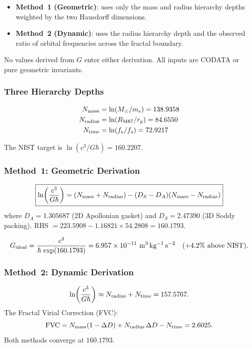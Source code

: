 \documentclass[11pt,a4paper]{article}
\begin{document}
\begin{itemize}
  \item \textbf{Method~1 (Geometric)}: uses only the mass and radius hierarchy depths weighted by the two Hausdorff dimensions.
  \item \textbf{Method~2 (Dynamic)}: uses the radius hierarchy depth and the observed ratio of orbital frequencies across the fractal boundary.
\end{itemize}

No values derived from $G$ enter either derivation. All inputs are CODATA or pure geometric invariants.

\subsubsection{Three Hierarchy Depths}

\begin{align}
  N_{\rm mass}   &= \ln(M_\odot/m_e) = 138.9358 \\
  N_{\rm radius} &= \ln(R_{\rm M87}/r_p) = 84.6550 \\
  N_{\rm time}   &= \ln(f_e/f_s) = 72.9217
\end{align}

The NIST target is $\ln(c^3/G\hbar) = 160.2207$.

\subsubsection{Method~1: Geometric Derivation}

\[
\boxed{
  \ln\!\left(\frac{c^3}{G\hbar}\right)
  = (N_{\rm mass} + N_{\rm radius})
    - (D_S - D_A)(N_{\rm mass} - N_{\rm radius})
}
\]
where $D_A = 1.305687$ (2D Apollonian gasket) and $D_S = 2.47390$ (3D Soddy packing). RHS $= 223.5908 - 1.16821 \times 54.2808 = \mathbf{160.1793}$.

\[
G_{\rm ideal} = \frac{c^3}{\hbar\,\exp(160.1793)}
  = 6.957\times10^{-11}\ \mathrm{m^3\,kg^{-1}\,s^{-2}}
  \quad (+4.2\%\ \text{above NIST}).
\]

\subsubsection{Method~2: Dynamic Derivation}

\[
\ln\!\left(\frac{c^3}{G\hbar}\right) \approx N_{\rm radius} + N_{\rm time}
  = 157.5767.
\]
The Fractal Virial Correction (FVC):
\[
\mathrm{FVC} = N_{\rm mass}(1-\Delta D) + N_{\rm radius}\,\Delta D - N_{\rm time} = 2.6025.
\]
Both methods converge at $160.1793$.
\end{document}
